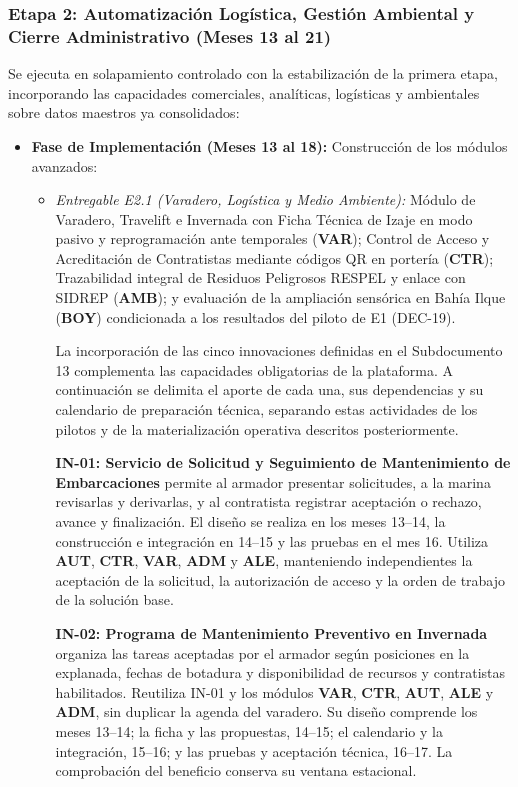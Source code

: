 \subsubsection{Etapa 2: Automatización Logística, Gestión Ambiental y Cierre Administrativo (Meses 13 al 21)}
Se ejecuta en solapamiento controlado con la estabilización de la primera etapa, incorporando las capacidades comerciales, analíticas, logísticas y ambientales sobre datos maestros ya consolidados:
\begin{itemize}
    \item \textbf{Fase de Implementación (Meses 13 al 18):} Construcción de los módulos avanzados:
    \begin{itemize}
        \item \emph{Entregable E2.1 (Varadero, Logística y Medio Ambiente):} Módulo de Varadero, Travelift e Invernada con Ficha Técnica de Izaje en modo pasivo y reprogramación ante temporales (\textbf{VAR}); Control de Acceso y Acreditación de Contratistas mediante códigos QR en portería (\textbf{CTR}); Trazabilidad integral de Residuos Peligrosos RESPEL y enlace con SIDREP (\textbf{AMB}); y evaluación de la ampliación sensórica en Bahía Ilque (\textbf{BOY}) condicionada a los resultados del piloto de E1 (DEC-19).

        La incorporación de las cinco innovaciones definidas en el Subdocumento 13 complementa las capacidades obligatorias de la plataforma. A continuación se delimita el aporte de cada una, sus dependencias y su calendario de preparación técnica, separando estas actividades de los pilotos y de la materialización operativa descritos posteriormente.

        \textbf{IN-01: Servicio de Solicitud y Seguimiento de Mantenimiento de Embarcaciones} permite al armador presentar solicitudes, a la marina revisarlas y derivarlas, y al contratista registrar aceptación o rechazo, avance y finalización. El diseño se realiza en los meses 13--14, la construcción e integración en 14--15 y las pruebas en el mes 16. Utiliza \textbf{AUT}, \textbf{CTR}, \textbf{VAR}, \textbf{ADM} y \textbf{ALE}, manteniendo independientes la aceptación de la solicitud, la autorización de acceso y la orden de trabajo de la solución base.

        \textbf{IN-02: Programa de Mantenimiento Preventivo en Invernada} organiza las tareas aceptadas por el armador según posiciones en la explanada, fechas de botadura y disponibilidad de recursos y contratistas habilitados. Reutiliza IN-01 y los módulos \textbf{VAR}, \textbf{CTR}, \textbf{AUT}, \textbf{ALE} y \textbf{ADM}, sin duplicar la agenda del varadero. Su diseño comprende los meses 13--14; la ficha y las propuestas, 14--15; el calendario y la integración, 15--16; y las pruebas y aceptación técnica, 16--17. La comprobación del beneficio conserva su ventana estacional.


\end{itemize}
\end{itemize}
